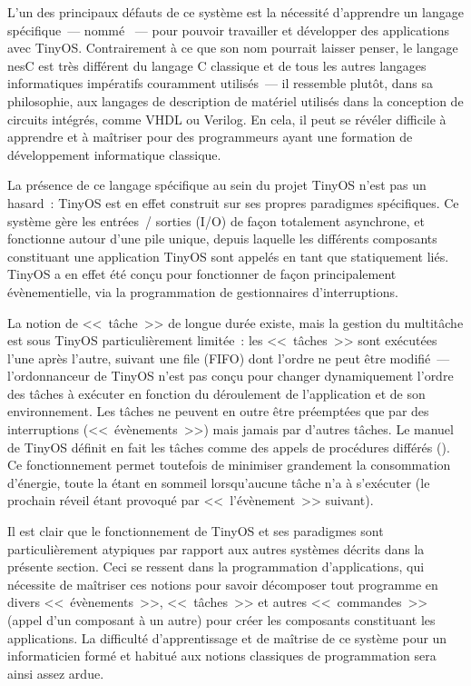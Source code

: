 L'un des principaux défauts de ce système est la nécessité d'apprendre
un langage spécifique~--- nommé  \cite{nesC}~--- pour pouvoir
travailler et développer des applications avec TinyOS. Contrairement à
ce que son nom pourrait laisser penser, le langage nesC est très différent
du langage C classique et de tous les autres langages informatiques
impératifs couramment utilisés~--- il ressemble plutôt, dans sa philosophie,
aux langages de description de matériel utilisés dans la conception de
circuits intégrés, comme VHDL ou Verilog. En cela, il peut se révéler
difficile à apprendre et à maîtriser pour des programmeurs ayant une
formation de développement informatique classique.

La présence de ce langage spécifique au sein du projet TinyOS n'est pas
un hasard~: TinyOS est en effet construit sur ses propres paradigmes
spécifiques. Ce système gère les entrées~/ sorties (I/O) de façon
totalement asynchrone, et fonctionne autour d'une pile unique, depuis
laquelle les différents composants constituant une application TinyOS
sont appelés en tant que  statiquement liés. 
TinyOS a en effet été conçu pour fonctionner de façon principalement
évènementielle, via la programmation de gestionnaires d'interruptions.

La notion de <<~tâche~>> de longue durée existe, mais la gestion du
multitâche est sous TinyOS particulièrement limitée~: les <<~tâches~>>
sont exécutées l'une après l'autre, suivant une file (FIFO) dont l'ordre
ne peut être modifié~--- l'ordonnanceur de TinyOS n'est pas conçu
pour changer dynamiquement l'ordre des tâches à exécuter en fonction
du déroulement de l'application et de son environnement. Les tâches
ne peuvent en outre être préemptées que par des interruptions
(<<~évènements~>>) mais jamais par d'autres tâches. Le manuel
de TinyOS définit en fait les tâches comme des appels de procédures
différés (). Ce fonctionnement
permet toutefois de minimiser grandement la consommation d'énergie,
toute la  étant en sommeil lorsqu'aucune tâche n'a à
s'exécuter (le prochain réveil étant provoqué par <<~l'évènement~>>
suivant).

Il est clair que le fonctionnement de TinyOS et ses paradigmes sont
particulièrement atypiques par rapport aux autres systèmes décrits
dans la présente section. Ceci se ressent dans la programmation
d'applications, qui nécessite de maîtriser ces notions pour savoir
décomposer tout programme en divers <<~évènements~>>, <<~tâches~>> et
autres <<~commandes~>> (appel d'un composant à un autre) pour créer
les composants constituant les applications.
La difficulté d'apprentissage et de maîtrise de ce système pour un
informaticien formé et habitué aux notions classiques de programmation
sera ainsi assez ardue.


